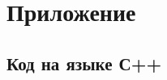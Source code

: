 \documentclass{article}
\begin{document}
   	\section{Приложение}
   		\subsection{Код на языке С++}
   			
			
			
	
	
\end{document}
